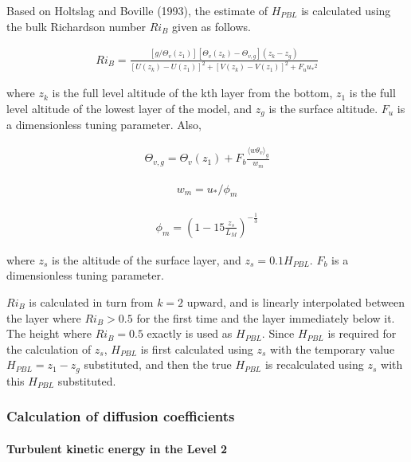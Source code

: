 Based on Holtslag and Boville (1993), the estimate of \(H_{PBL}\) is
calculated using the bulk Richardson number \(Ri_B\) given as follows.

\begin{eqnarray}Ri_B=\frac{[g/\Theta_v(z_1)][\Theta_v(z_k)-\Theta_{v,g}](z_k-z_g)}{[U(z_k)-U(z_1)]^2+[V(z_k)-V(z_1)]^2+F_u{u_*}^2}\end{eqnarray}

where \(z_k\) is the full level altitude of the kth layer from the
bottom, \(z_1\) is the full level altitude of the lowest layer of the
model, and \(z_g\) is the surface altitude. \(F_u\) is a dimensionless
tuning parameter. Also,

\begin{eqnarray}\Theta_{v,g}=\Theta_v(z_1)+F_b \frac{\langle w\theta_v \rangle_g}{w_m}\end{eqnarray}

\begin{eqnarray}w_m=u_*/\phi_m\end{eqnarray}

\begin{eqnarray}\phi_m=\left(1-15\frac{z_s}{L_M}\right)^{-\frac{1}{3}}\end{eqnarray}

where \(z_s\) is the altitude of the surface layer, and
\(z_s=0.1H_{PBL}\). \(F_b\) is a dimensionless tuning parameter.

\(Ri_B\) is calculated in turn from \(k=2\) upward, and is linearly
interpolated between the layer where \(Ri_B>0.5\) for the first time and
the layer immediately below it. The height where \(Ri_B=0.5\) exactly is
used as \(H_{PBL}\). Since \(H_{PBL}\) is required for the calculation
of \(z_s\), \(H_{PBL}\) is first calculated using \(z_s\) with the
temporary value \(H_{PBL}=z_1-z_g\) substituted, and then the true
\(H_{PBL}\) is recalculated using \(z_s\) with this \(H_{PBL}\)
substituted.

\hypertarget{calculation-of-diffusion-coefficients}{%
\subsubsection{Calculation of diffusion
coefficients}\label{calculation-of-diffusion-coefficients}}

\hypertarget{turbulent-kinetic-energy-in-the-level-2}{%
\paragraph{Turbulent kinetic energy in the Level
2}\label{turbulent-kinetic-energy-in-the-level-2}}

